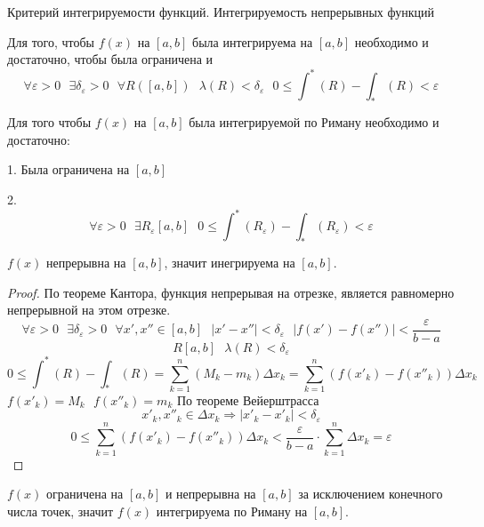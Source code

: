 \begin{title}[\Large]
  Критерий интегрируемости функций. Интегрируемость непрерывных функций
\end{title}

\begin{block}
  Для того, чтобы $f(x)$ на $[a,b]$ была интегрируема на $[a,b]$ необходимо
  и достаточно, чтобы была ограничена и
  \[
    \forall \varepsilon > 0 ~~~ \exists \delta_\varepsilon > 0 ~~~ \forall R
    ([a,b]) ~~~ \lambda (R) < \delta_\varepsilon ~~~ 0 \le \int^* (R) -
    \int_* (R) < \varepsilon
  \]
\end{block}

\begin{block}[Замечание]
  Для того чтобы $f(x)$ на $[a,b]$ была интегрируемой по Риману необходимо и
  достаточно:

  1. Была ограничена на $[a,b]$

  2.
  $$
  \forall \varepsilon > 0 ~~~ \exists R_{\varepsilon} [a,b] ~~~
  0 \le \int^*(R_{\varepsilon}) - \int_*(R_{\varepsilon}) < \varepsilon
  $$
\end{block}

\begin{theorem}
  $f(x)$ непрерывна на $[a,b]$, значит инегрируема на $[a,b]$.
\end{theorem}

\begin{proof}
  По теореме Кантора, функция непрерывая на отрезке, является равномерно
  непрерывной на этом отрезке.
  \[
    \forall \varepsilon > 0 ~~~ \exists \delta_\varepsilon > 0 ~~~ \forall
    x', x'' \in [a,b] ~~~ |x' - x''| < \delta_\varepsilon ~~~
    |f(x') - f(x'')| < \frac{\varepsilon}{b - a}
  \]
  \[R [a,b] ~~~ \lambda (R) < \delta_\varepsilon\]
  \[
    0 \le \int^* (R) - \int_* (R) = \sum_{k = 1}^{n} (M_k - m_k)
    \Delta x_k = \sum_{k = 1}^{n} (f(x'_k) - f(x''_k)) \Delta x_k
  \]
  $f(x'_k) = M_k ~~~ f(x''_k) = m_k$
  По теореме Вейерштрасса
  \[x'_k, x''_k \in \Delta x_k \Rightarrow |x'_k - x'_k| < \delta_\varepsilon\]
  \[
    0 \le \sum_{k = 1}^{n} (f(x'_k) - f(x''_k)) \Delta x_k <
    \frac{\varepsilon}{b - a} \cdot \sum_{k = 1}^{n} \Delta x_k = \varepsilon
  \]
\end{proof}

\begin{theorem}
  $f(x)$ ограничена на $[a,b]$ и непрерывна на $[a,b]$ за исключением конечного
  числа точек, значит $f(x)$ интегрируема по Риману на $[a,b]$.
\end{theorem}

